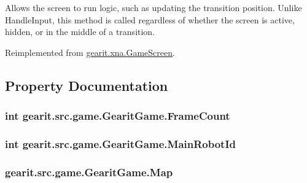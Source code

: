 Allows the screen to run logic, such as updating the transition position. Unlike Handle\+Input, this method is called regardless of whether the screen is active, hidden, or in the middle of a transition. 



Reimplemented from \hyperlink{classgearit_1_1xna_1_1_game_screen_a6bb803502dfbd62b275c2a21d182f88e}{gearit.\+xna.\+Game\+Screen}.



\subsection{Property Documentation}
\hypertarget{classgearit_1_1src_1_1game_1_1_gearit_game_a71d5ca6ce46f28b63a76d15336639c9a}{
\subsubsection[{Frame\+Count}]{\setlength{\rightskip}{0pt plus 5cm}int gearit.\+src.\+game.\+Gearit\+Game.\+Frame\+Count\hspace{0.3cm}{\ttfamily [get]}}}\label{classgearit_1_1src_1_1game_1_1_gearit_game_a71d5ca6ce46f28b63a76d15336639c9a}
\hypertarget{classgearit_1_1src_1_1game_1_1_gearit_game_a053395a387ed8c732cabea5d34680bbb}{
\subsubsection[{Main\+Robot\+Id}]{\setlength{\rightskip}{0pt plus 5cm}int gearit.\+src.\+game.\+Gearit\+Game.\+Main\+Robot\+Id\hspace{0.3cm}{\ttfamily [get]}}}\label{classgearit_1_1src_1_1game_1_1_gearit_game_a053395a387ed8c732cabea5d34680bbb}
\hypertarget{classgearit_1_1src_1_1game_1_1_gearit_game_a4ea1a35c155c76c392c47947a9e134d4}{
\subsubsection[{Map}]{ gearit.\+src.\+game.\+Gearit\+Game.\+Map\hspace{0.3cm}{\ttfamily [get]}}}\label{classgearit_1_1src_1_1game_1_1_gearit_game_a4ea1a35c155c76c392c47947a9e134d4}
